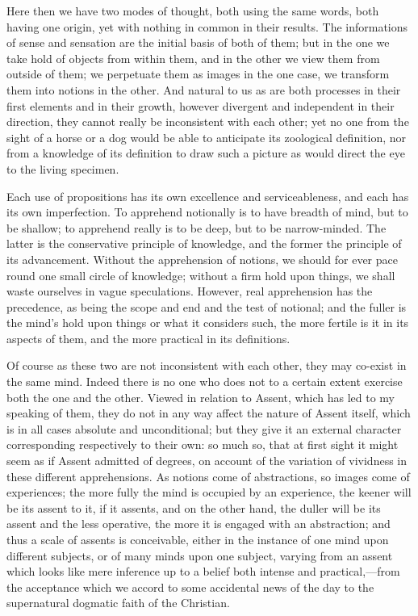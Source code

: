Here then we have two modes of thought, both using the same words,
both having one origin, yet with nothing in common in their results.
The informations of sense and sensation are the initial basis of both
of them; but in the one we take hold of objects from within them, and
in the other we view them from outside of them; we perpetuate them as
images in the one case, we transform them into notions in the other.
And natural to us as are both processes in their first elements and in
their growth, however divergent and independent in their direction,
they cannot really be inconsistent with each other; yet no one from
the sight of a horse or a dog would be able to anticipate its
zoological definition, nor from a knowledge of its definition to draw
such a picture as would direct the eye to the living specimen.

Each use of propositions has its own excellence and
serviceableness, and each has its own imperfection. To apprehend
notionally is to have breadth of mind, but to be shallow; to apprehend
really is to be deep, but to be narrow-minded. The latter is the
conservative principle of knowledge, and the former the principle of
its advancement. Without the apprehension of notions, we should for
ever pace round one small circle of knowledge; without a firm hold
upon things, we shall waste ourselves in vague speculations. However,
real apprehension has the precedence, as being the scope and end and
the test of notional; and the fuller is the mind's hold upon things or
what it considers such, the more fertile is it in its aspects of them,
and the more practical in its definitions.

Of course as these two are not inconsistent with each other,
they may co-exist in the same mind. Indeed there is no one who does
not to a certain extent exercise both the one and the other. Viewed in
relation to Assent, which has led to my speaking of them, they do not
in any way affect the nature of Assent itself, which is in all cases
absolute and unconditional; but they give it an external character
corresponding respectively to their own: so much so, that at first
sight it might seem as if Assent admitted of degrees, on account of
the variation of vividness in these different apprehensions. As
notions come of abstractions, so images come of experiences; the more
fully the mind is occupied by an experience, the keener will be its
assent to it, if it assents, and on the other hand, the duller will be
its assent and the less operative, the more it is engaged with an
abstraction; and thus a scale of assents is conceivable, either in the
instance of one mind upon different subjects, or of many minds upon
one subject, varying from an assent which looks like mere inference up
to a belief both intense and practical,—from the acceptance which we
accord to some accidental news of the day to the supernatural dogmatic
faith of the Christian.


